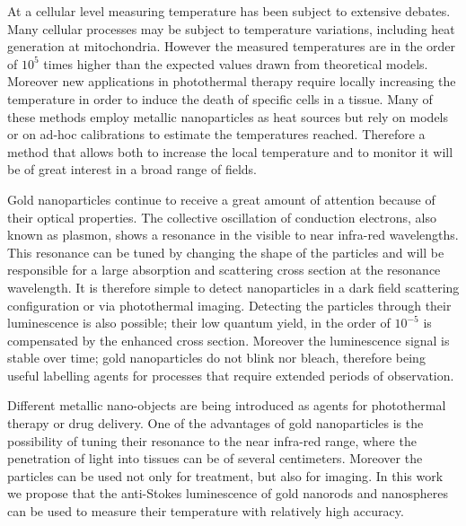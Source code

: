 At a cellular level measuring temperature has been subject to extensive
debates\cite{Yang2011a,Suzuki2015}. Many cellular processes may be subject to
temperature variations, including heat generation at mitochondria. However the
measured temperatures\cite{Yang2011} are in the order of $10^5$ times higher
than the expected values drawn from theoretical models\cite{Sato2014}.
Moreover new applications in photothermal therapy require locally increasing the
temperature in order to induce the death of specific cells in a
tissue\cite{Huang2008,Huang2006}. Many of these methods employ metallic
nanoparticles as heat sources\cite{Gobin2007,Hirsch2003} but rely on
models\cite{Zhao2014a} or on ad-hoc calibrations to estimate the temperatures
reached\cite{Donner2013}. Therefore a method that allows both to increase the
local temperature and to monitor it will be of great interest in a broad range
of fields.

Gold nanoparticles continue to receive a great amount of attention because of
their optical properties\cite{Zijlstra2011}. The collective oscillation of
conduction electrons, also known as plasmon, shows a resonance in the visible to
near infra-red wavelengths. This resonance can be tuned by changing the shape of
the particles\cite{Carattino2016} and will be responsible for a large absorption
and scattering cross section at the resonance wavelength. It is therefore simple
to detect nanoparticles in a dark field scattering\cite{Hu2008} configuration or
via photothermal imaging\cite{Berciaud2006}. Detecting the particles through
their luminescence\cite{Tcherniak2011} is also possible; their low quantum
yield\cite{Fang2012,Rao2015,Yorulmaz2012,Cheng2015}, in the order of $10^{-5}$
is compensated by the enhanced cross section. Moreover the luminescence signal
is stable over time; gold nanoparticles do not blink nor bleach, therefore being
useful labelling agents for processes that require extended periods of
observation\cite{Wang2005}.

Different metallic nano-objects are being introduced as agents for photothermal
therapy or drug delivery\cite{Kang2013}. One of the advantages of gold
nanoparticles is the possibility of tuning their resonance to the near infra-red
range, where the penetration of light into tissues can be of several
centimeters\cite{Huang2006,Gobin2007,Hirsch2003,ONeal2004,Li2013c,Huang2008}.
Moreover the particles can be used not only for treatment, but also for
imaging\cite{Zhao2014a,Huang2006}. In this work we propose that the anti-Stokes
luminescence of gold nanorods and nanospheres can be used to measure their
temperature with relatively high accuracy.


